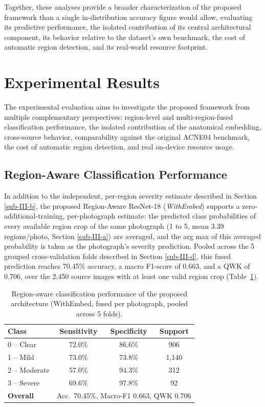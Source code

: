 \documentclass[conference]{IEEEtran}
\begin{document}
Together, these analyses provide a broader characterization of the proposed framework than a single in-distribution accuracy figure would allow, evaluating its predictive performance, the isolated contribution of its central architectural component, its behavior relative to the dataset's own benchmark, the cost of automatic region detection, and its real-world resource footprint.


\section{Experimental Results}
The experimental evaluation aims to investigate the proposed framework from multiple complementary perspectives: region-level and multi-region-fused classification performance, the isolated contribution of the anatomical embedding, cross-source behavior, comparability against the original ACNE04 benchmark, the cost of automatic region detection, and real on-device resource usage.

\FloatBarrier
\subsection{Region-Aware Classification Performance}\label{sub-IV-a}
In addition to the independent, per-region severity estimate described in Section \ref{sub-III-b}, the proposed Region-Aware ResNet-18 (\textit{WithEmbed}) supports a zero-additional-training, per-photograph estimate: the predicted class probabilities of every available region crop of the same photograph (1 to 5, mean 3.39 regions/photo, Section \ref{sub-III-a}) are averaged, and the arg max of this averaged probability is taken as the photograph's severity prediction. Pooled across the 5 grouped cross-validation folds described in Section \ref{sub-III-d}, this fused prediction reaches 70.45\% accuracy, a macro F1-score of 0.663, and a QWK of 0.706, over the 2,450 source images with at least one valid region crop (Table~\ref{tab:metrics}).
\begin{table}[H]
\caption{Region-aware classification performance of the proposed architecture (WithEmbed, fused per photograph, pooled across 5 folds).}
\begin{center}
\small
\begin{tabular}{|l|c|c|c|}
\hline
\textbf{Class} & \textbf{Sensitivity} & \textbf{Specificity} & \textbf{Support} \\
\hline
0 -- Clear    & 72.0\% & 86.6\% & 906 \\
\hline
1 -- Mild     & 73.0\% & 73.8\% & 1,140 \\
\hline
2 -- Moderate & 57.0\% & 94.3\% & 312 \\
\hline
3 -- Severe   & 69.6\% & 97.8\% & 92 \\
\hline
\textbf{Overall} & \multicolumn{3}{p{4.3cm}|}{Acc.\ 70.45\%, Macro-F1 0.663, QWK 0.706} \\
\hline
\end{tabular}
\label{tab:metrics}
\end{center}
\end{table}
\end{document}
